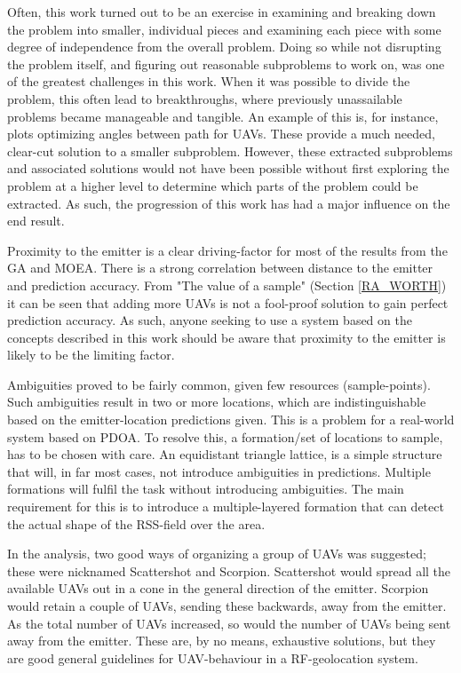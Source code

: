 \documentclass[10pt,a4paper]{book}
\begin{document}

Often, this work turned out to be an exercise in examining and breaking down the problem into smaller, individual pieces and examining each piece with some degree of independence from the overall problem. Doing so while not disrupting the problem itself, and figuring out reasonable subproblems to work on, was one of the greatest challenges in this work. When it was possible to divide the problem, this often lead to breakthroughs, where previously unassailable problems became manageable and tangible. An example of this is, for instance, plots optimizing angles between path for \glspl{UAV}. These provide a much needed, clear-cut solution to a smaller subproblem. However, these extracted subproblems and associated solutions would not have been possible without first exploring the problem at a higher level to determine which parts of the problem could be extracted. As such, the progression of this work has had a major influence on the end result. 


Proximity to the emitter is a clear driving-factor for most of the results from the \gls{GA} and \gls{MOEA}. There is a strong correlation between distance to the emitter and prediction accuracy. From "The value of a sample" (Section \ref{RA_WORTH}) it can be seen that adding more \glspl{UAV} is not a fool-proof solution to gain perfect prediction accuracy. As such, anyone seeking to use a system based on the concepts described in this work should be aware that proximity to the emitter is likely to be the limiting factor.


Ambiguities proved to be fairly common, given few resources (sample-points). Such ambiguities result in two or more locations, which are indistinguishable based on the emitter-location predictions given. This is a problem for a real-world system based on \gls{PDOA}. To resolve this, a formation/set of locations to sample, has to be chosen with care. An equidistant triangle lattice, is a simple structure that will, in far most cases, not introduce ambiguities in predictions. Multiple formations will fulfil the task without introducing ambiguities. The main requirement for this is to introduce a multiple-layered formation that can detect the actual shape of the \gls{RSS}-field over the area.


In the analysis, two good ways of organizing a group of \glspl{UAV} was suggested; these were nicknamed Scattershot and Scorpion. Scattershot would spread all the available \glspl{UAV} out in a cone in the general direction of the emitter. Scorpion would retain a couple of \glspl{UAV}, sending these backwards, away from the emitter. As the total number of \glspl{UAV} increased, so would the number of \glspl{UAV} being sent away from the emitter. These are, by no means, exhaustive solutions, but they are good general guidelines for \gls{UAV}-behaviour in a \gls{RF}-geolocation system. 
\end{document}
